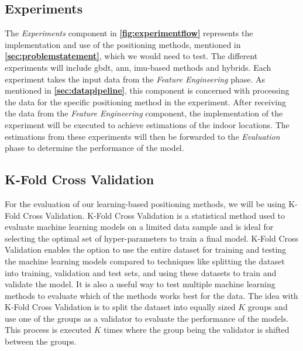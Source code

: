 \subsection{Experiments}
The \textit{Experiments} component in \textbf{\autoref{fig:experimentflow}} represents the implementation and use of the positioning methods, mentioned in \textbf{\autoref{sec:problemstatement}}, which we would need to test. The different experiments will include \gls{gbdt}, \gls{ann}, \gls{imu}-based methods and hybrids. Each experiment takes the input data from the \textit{Feature Engineering} phase. As mentioned in \textbf{\autoref{sec:datapipeline}}, this component is concerned with processing the data for the specific positioning method in the experiment. After receiving the data from the \textit{Feature Engineering} component, the implementation of the experiment will be executed to achieve estimations of the indoor locations. The estimations from these experiments will then be forwarded to the \textit{Evaluation} phase to determine the performance of the model.
%

\subsection{K-Fold Cross Validation}
For the evaluation of our learning-based positioning methods, we will be using K-Fold Cross Validation. K-Fold Cross Validation is a statistical method used to evaluate machine learning models on a limited data sample and is ideal for selecting the optimal set of hyper-parameters to train a final model. K-Fold Cross Validation enables the option to use the entire dataset for training and testing the machine learning models compared to techniques like splitting the dataset into training, validation and test sets, and using these datasets to train and validate the model. It is also a useful way to test multiple machine learning methods to evaluate which of the methods works best for the data. 
The idea with K-Fold Cross Validation is to split the dataset into equally sized $K$ groups and use one of the groups as a validator to evaluate the performance of the models. This process is executed $K$ times where the group being the validator is shifted between the groups.\cite{kfold}

